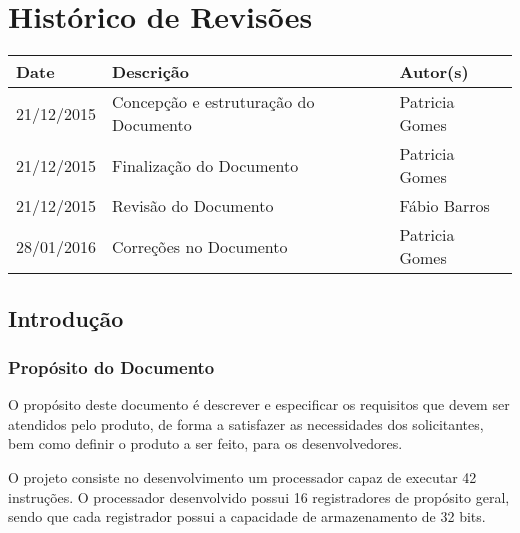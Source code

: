 \documentclass{report}
\begin{document}

\capa
\newpage
\newpage

\chapter*{Histórico de Revisões}
  \vspace*{1cm}
  \begin{table}[ht]
    \centering
    \begin{tabular}[pos]{|m{2cm} | m{6cm} | m{3cm}|} 
      \hline
      \cellcolor[gray]{0.9}\textbf{Date} & \cellcolor[gray]{0.9}\textbf{Descrição} & \cellcolor[gray]{0.9}\textbf{Autor(s)}\\
      \hline
      21/12/2015 & Concepção e estruturação do Documento & Patricia Gomes \\ \hline      
      21/12/2015 & Finalização do Documento & Patricia Gomes \\ \hline      
      21/12/2015 & Revisão do Documento & Fábio Barros \\ \hline 
      28/01/2016 & Correções no Documento & Patricia Gomes \\ \hline
    \end{tabular}
  \end{table}

\newpage

\tableofcontents
\newpage

\section{Introdução}
 \subsection{Propósito do Documento}
 O propósito deste documento é descrever e especificar os requisitos que devem ser  atendidos pelo produto, de forma a satisfazer as necessidades dos solicitantes, bem como definir o produto a ser feito, para os desenvolvedores.
 
  O projeto consiste no desenvolvimento um processador capaz de executar 42 instruções. O processador desenvolvido possui 16 registradores de propósito geral, sendo que cada registrador possui a capacidade de armazenamento de 32 bits.
  
\end{document}
